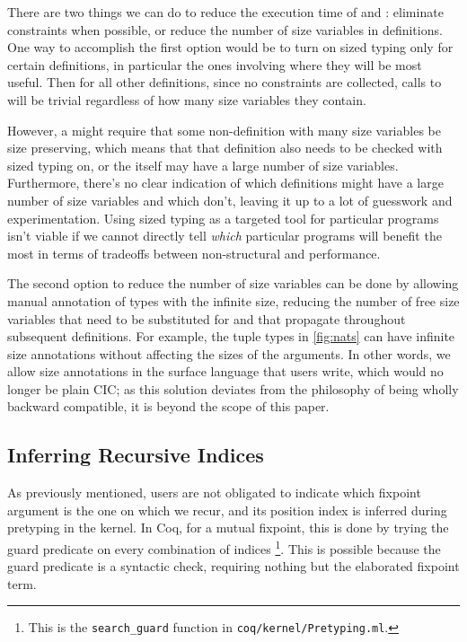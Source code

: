 There are two things we can do to reduce the execution time of \solve and \RecCheck:
eliminate constraints when possible, or reduce the number of size variables in definitions.
One way to accomplish the first option would be to turn on sized typing only for certain definitions,
in particular the ones involving \cofixpoints where they will be most useful.
Then for all other definitions, since no constraints are collected,
calls to \solve will be trivial regardless of how many size variables they contain.

However, a \cofixpoint might require that some non-\corecursive definition with many size variables be size preserving,
which means that that definition also needs to be checked with sized typing on,
or the \cofixpoint itself may have a large number of size variables.
Furthermore, there's no clear indication of which definitions might have a large number of size variables and which don't,
leaving it up to a lot of guesswork and experimentation.
Using sized typing as a targeted tool for particular programs isn't viable
if we cannot directly tell \emph{which} particular programs will benefit the most
in terms of tradeoffs between non-structural \corecursion and performance.

The second option to reduce the number of size variables can be done by allowing manual annotation of \coinductive types with the infinite size,
reducing the number of free size variables that need to be substituted for
and that propagate throughout subsequent definitions.
For example, the tuple types in \autoref{fig:nats} can have infinite size annotations
without affecting the sizes of the  arguments.
In other words, we allow size annotations in the surface language that users write,
which would no longer be plain CIC;
as this solution deviates from the philosophy of being wholly backward compatible,
it is beyond the scope of this paper.

\subsection{Inferring Recursive Indices}\label{sec:impl:recind}

As previously mentioned, users are not obligated to indicate which fixpoint argument is the one on which we recur,
and its position index is inferred during pretyping in the kernel.
In Coq, for a mutual fixpoint, this is done by trying the guard predicate on every combination of indices%
\footnote{This is the \texttt{search\_guard} function in \texttt{coq/kernel/Pretyping.ml}.}.
This is possible because the guard predicate is a syntactic check, requiring nothing but the elaborated fixpoint term.


